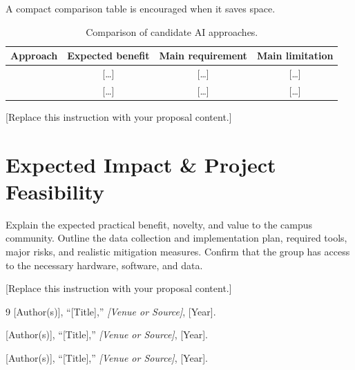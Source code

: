 \documentclass{article}
\begin{document}
A compact comparison table is encouraged when it saves space.
\begin{table}[t]
  \centering
  \caption{Comparison of candidate AI approaches.}
  \label{tab:approach-comparison}
  \begin{tabular}{lccc}
    \toprule
    Approach & Expected benefit & Main requirement & Main limitation \\
    \midrule
    [A] & [\ldots] & [\ldots] & [\ldots] \\
    [B] & [\ldots] & [\ldots] & [\ldots] \\
    \bottomrule
  \end{tabular}
\end{table}

[Replace this instruction with your proposal content.]

\section{Expected Impact \& Project Feasibility}
Explain the expected practical benefit, novelty, and value to the campus community. Outline the data collection and implementation plan, required tools, major risks, and realistic mitigation measures. Confirm that the group has access to the necessary hardware, software, and data.

[Replace this instruction with your proposal content.]

\begin{thebibliography}{9}
\small
{}
[Author(s)], ``[Title],'' \emph{[Venue or Source]}, [Year].

[Author(s)], ``[Title],'' \emph{[Venue or Source]}, [Year].

[Author(s)], ``[Title],'' \emph{[Venue or Source]}, [Year].

\end{thebibliography}

\end{document}
